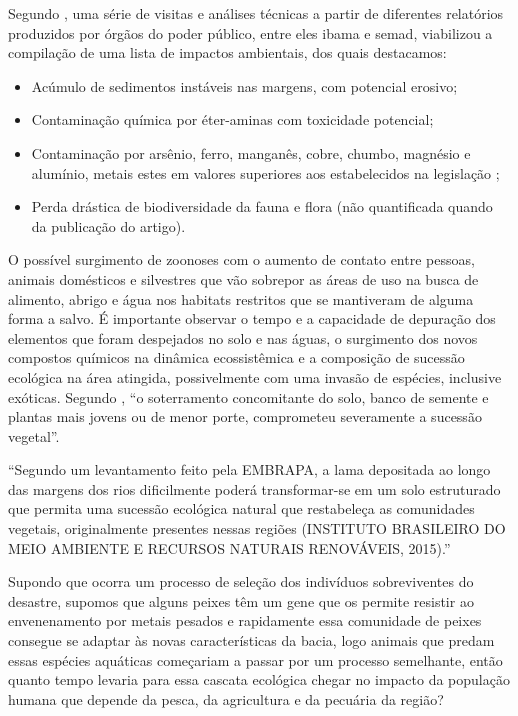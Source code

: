 \documentclass[
article,			%
11pt,				%
oneside,			%
a4paper,			%
english,			%
brazil,				%
sumario=tradicional
]{abntex2}
\begin{document}
	Segundo , uma série de visitas e análises técnicas a partir de diferentes relatórios produzidos por órgãos do poder público, entre eles \gls{ibama} e \gls{semad}, viabilizou a compilação de uma lista de impactos ambientais, dos quais destacamos:
	
	\begin{itemize}
		\item Acúmulo de sedimentos instáveis nas margens, com potencial erosivo;
		\item Contaminação química por éter-aminas com toxicidade potencial;
		\item Contaminação por arsênio, ferro, manganês, cobre, chumbo, magnésio e alumínio, metais estes em valores superiores aos estabelecidos na legislação ;
		\item Perda drástica de biodiversidade da fauna e flora (não quantificada quando da publicação do artigo).
	\end{itemize}
	
	O possível surgimento de zoonoses com o aumento de contato entre pessoas, animais domésticos e silvestres que vão sobrepor as áreas de uso na busca de alimento, abrigo e água nos habitats restritos que se mantiveram de alguma forma a salvo. É importante observar o tempo e a capacidade de depuração dos elementos que foram despejados no solo e nas águas, o surgimento dos novos compostos químicos na dinâmica ecossistêmica e a composição de sucessão ecológica na área atingida, possivelmente com uma invasão de espécies, inclusive exóticas. Segundo , ``o soterramento concomitante do solo, banco de semente e plantas mais jovens ou de menor porte, comprometeu severamente a sucessão vegetal''. 
	
	\begin{citacao}
		``Segundo um levantamento feito pela EMBRAPA, a lama depositada
		ao longo das margens dos rios dificilmente poderá transformar-se
		em um solo estruturado que permita uma sucessão ecológica
		natural que restabeleça as comunidades vegetais, originalmente
		presentes nessas regiões (INSTITUTO BRASILEIRO DO MEIO
		AMBIENTE E RECURSOS NATURAIS RENOVÁVEIS, 2015).'' \cite{pinto2015a}
	\end{citacao}
	
	Supondo que ocorra um processo de seleção dos indivíduos sobreviventes do desastre, supomos que alguns peixes têm um gene que os permite resistir ao envenenamento por metais pesados e rapidamente essa comunidade de peixes consegue se adaptar às novas características da bacia, logo animais que predam essas espécies aquáticas começariam a passar por um processo semelhante, então quanto tempo levaria para essa cascata ecológica chegar no impacto da população humana que depende da pesca, da agricultura e da pecuária da região?
	
\end{document}
